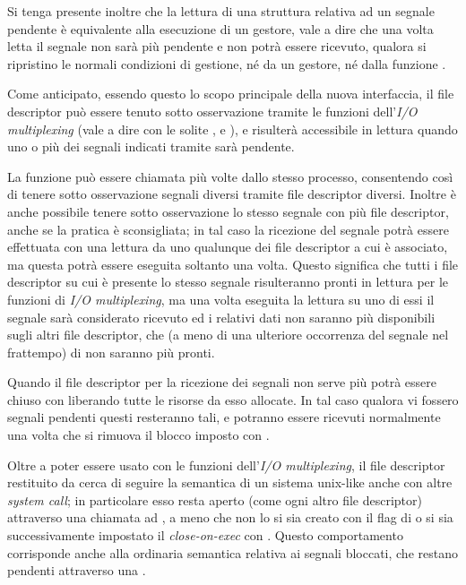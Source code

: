 Si tenga presente inoltre che la lettura di una struttura
 relativa ad un segnale pendente è equivalente alla
esecuzione di un gestore, vale a dire che una volta letta il segnale non sarà
più pendente e non potrà essere ricevuto, qualora si ripristino le normali
condizioni di gestione, né da un gestore, né dalla funzione .

Come anticipato, essendo questo lo scopo principale della nuova interfaccia,
il file descriptor può essere tenuto sotto osservazione tramite le funzioni
dell'\textit{I/O multiplexing} (vale a dire con le solite ,
 e ), e risulterà accessibile in lettura quando
uno o più dei segnali indicati tramite  sarà pendente.

La funzione può essere chiamata più volte dallo stesso processo, consentendo
così di tenere sotto osservazione segnali diversi tramite file descriptor
diversi. Inoltre è anche possibile tenere sotto osservazione lo stesso segnale
con più file descriptor, anche se la pratica è sconsigliata; in tal caso la
ricezione del segnale potrà essere effettuata con una lettura da uno qualunque
dei file descriptor a cui è associato, ma questa potrà essere eseguita
soltanto una volta. Questo significa che tutti i file descriptor su cui è
presente lo stesso segnale risulteranno pronti in lettura per le funzioni di
\textit{I/O multiplexing}, ma una volta eseguita la lettura su uno di essi il
segnale sarà considerato ricevuto ed i relativi dati non saranno più
disponibili sugli altri file descriptor, che (a meno di una ulteriore
occorrenza del segnale nel frattempo) di non saranno più pronti.

Quando il file descriptor per la ricezione dei segnali non serve più potrà
essere chiuso con  liberando tutte le risorse da esso allocate. In
tal caso qualora vi fossero segnali pendenti questi resteranno tali, e
potranno essere ricevuti normalmente una volta che si rimuova il blocco
imposto con .

Oltre a poter essere usato con le funzioni dell'\textit{I/O multiplexing}, il
file descriptor restituito da  cerca di seguire la semantica di
un sistema unix-like anche con altre \textit{system call}; in particolare esso
resta aperto (come ogni altro file descriptor) attraverso una chiamata ad
, a meno che non lo si sia creato con il flag di
 o si sia successivamente impostato il
\textit{close-on-exec} con . Questo comportamento corrisponde
anche alla ordinaria semantica relativa ai segnali bloccati, che restano
pendenti attraverso una .

